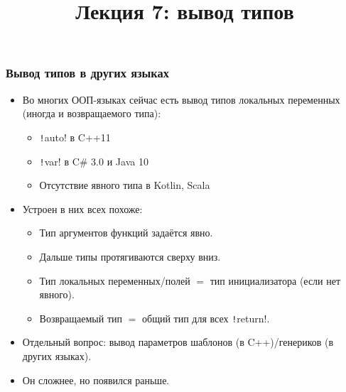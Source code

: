 \documentclass[11pt]{beamer}
\title{Лекция 7: вывод типов}
\begin{document}
\begin{frame}[plain]
  \maketitle
\end{frame}

\begin{frame}[fragile]
  \frametitle{Вывод типов в других языках}
  \begin{itemize}
    \item Во многих ООП-языках сейчас есть вывод типов локальных переменных (иногда и возвращаемого типа):
          \hspace{-1em}
          \pause
          \begin{itemize}
            \item \texttt!auto! в C++11
            \item \texttt!var! в C\# 3.0 и Java 10
            \item Отсутствие явного типа в Kotlin, Scala
          \end{itemize}
          \pause
    \item Устроен в них всех похоже:
          \begin{itemize}
            \pause
            \item Тип аргументов функций задаётся явно.
                  \pause
            \item Дальше типы протягиваются сверху вниз.
                  \pause
            \item Тип локальных переменных/полей $=$ тип инициализатора (если нет явного).
                  \pause
            \item Возвращаемый тип $=$ общий тип для всех \texttt!return!.
          \end{itemize}
          \pause
    \item Отдельный вопрос: вывод параметров шаблонов (в C++)/генериков (в других языках).
          \pause
    \item Он сложнее, но появился раньше.
  \end{itemize}
\end{frame}
\end{document}
